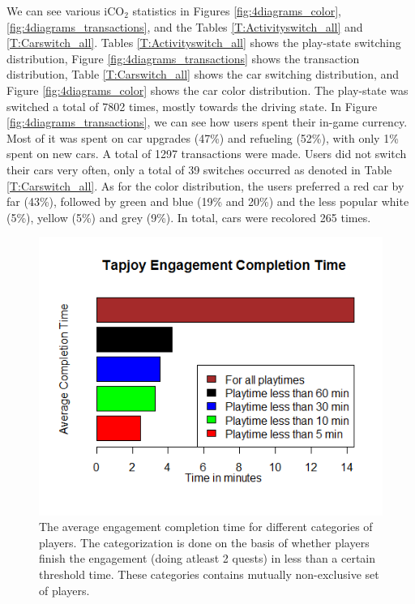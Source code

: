 \documentclass[preprint,authoryear,12pt]{elsarticle}
\begin{document}
We can see various iCO$_2$ statistics in 
Figures \ref{fig:4diagrams_color}, \ref{fig:4diagrams_transactions}, and the Tables \ref{T:Activityswitch_all} and \ref{T:Carswitch_all}. 
Tables \ref{T:Activityswitch_all} shows the play-state switching distribution, Figure \ref{fig:4diagrams_transactions} shows the transaction distribution, Table \ref{T:Carswitch_all} shows the car switching distribution, and Figure \ref{fig:4diagrams_color} shows the car color distribution. The play-state was switched a total of 7802 times, mostly towards the driving state. In Figure \ref{fig:4diagrams_transactions}, we can see how users spent their in-game currency. Most of it was spent on car upgrades (47\%) and refueling (52\%), with only 1\% spent on new cars. A total of 1297 transactions were made. Users did not switch their cars very often, only a total of 39 switches occurred as denoted in Table \ref{T:Carswitch_all}. As for the color distribution, the users preferred a red car by far (43\%), followed by green and blue (19\% and 20\%) and the less popular white (5\%), yellow (5\%) and grey (9\%). In total, cars were recolored 265 times.

\begin{figure}[htb]
	\begin{center}
		\includegraphics[width=.6\linewidth]{ijhcs14-img/time}
		\caption{ The average engagement completion time for different categories of players. The categorization is done on the basis of whether players finish the engagement (doing atleast 2 quests) in less than a certain threshold time. These categories contains mutually non-exclusive set of players.\label{fig:time}}
	\end{center}
\end{figure}
\end{document}
